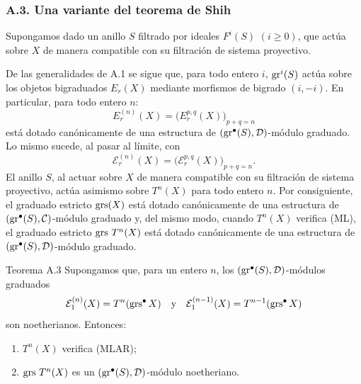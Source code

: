 \subsubsection*{A.3. Una variante del teorema de Shih}
Supongamos dado un anillo \(S\) filtrado por ideales \(F^i(S)\) \((i\ge0)\), que actúa sobre \(X\) de manera compatible con su filtración de sistema proyectivo.

De las generalidades de A.1 se sigue que, para todo entero \(i\), \(\operatorname{gr}^i(S)\) actúa sobre los objetos bigraduados \(E_r(X)\) mediante morfismos de bigrado \((i,-i)\). En particular, para todo entero \(n\):
\[
E_r^{(n)}(X)=\bigl(E_r^{p,q}(X)\bigr)_{p+q=n}
\]
está dotado canónicamente de una estructura de \((\operatorname{gr}^\bullet(S),\mathcal D)\)-módulo graduado. Lo mismo sucede, al pasar al límite, con
\[
\mathcal E_r^{(n)}(X)=\bigl(\mathcal E_r^{p,q}(X)\bigr)_{p+q=n}.
\]
El anillo \(S\), al actuar sobre \(X\) de manera compatible con su filtración de sistema proyectivo, actúa asimismo sobre \(T^n(X)\) para todo entero \(n\). Por consiguiente, el graduado estricto \(\operatorname{grs}(X)\) está dotado canónicamente de una estructura de \((\operatorname{gr}^\bullet(S),\mathcal C)\)-módulo graduado y, del mismo modo, cuando \(T^n(X)\) verifica (ML), el graduado estricto \(\operatorname{grs}\,T^n(X)\) está dotado canónicamente de una estructura de \((\operatorname{gr}^\bullet(S),\mathcal D)\)-módulo graduado.

\begin{statement}{Teorema A.3}
Supongamos que, para un entero \(n\), los \((\operatorname{gr}^\bullet(S),\mathcal D)\)-módulos graduados
\[
\mathcal E_1^{(n)}(X)=T^n(\operatorname{grs}^\bullet X)
\quad\text{y}\quad
\mathcal E_1^{(n-1)}(X)=T^{n-1}(\operatorname{grs}^\bullet X)
\]
son noetherianos. Entonces:
\begin{enumerate}[label=\textup{(\roman*)}]
\item \(T^n(X)\) verifica (MLAR);
\item \(\operatorname{grs}\,T^n(X)\) es un \((\operatorname{gr}^\bullet(S),\mathcal D)\)-módulo noetheriano.
\end{enumerate}
\end{statement}
